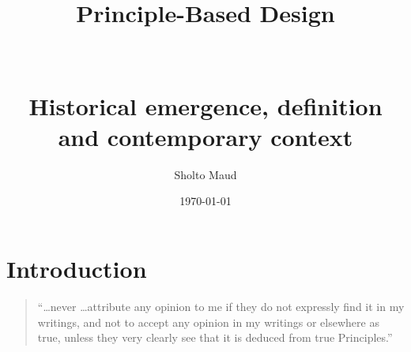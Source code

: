 \documentclass[a4paper, 12pt]{article}
\title{Principle-Based Design \\
\\
\\
\small{Historical emergence, definition and contemporary context}}
\author{Sholto Maud}
\date{\today}
\begin{document}
\maketitle 
\tableofcontents
\listoffigures

\newpage

\chapter{Introduction}
\label{chp:intro}





\begin{quotation}
    ``\dots never \dots attribute any opinion to me if they do not expressly find it in my writings, and not to accept any opinion in my writings or elsewhere as true, unless they very clearly see that it is deduced from true Principles.'' \citep[p.~xxvii]{descartes_principles_1982} 
\end{quotation}



\vskip 1cm
\end{document}
